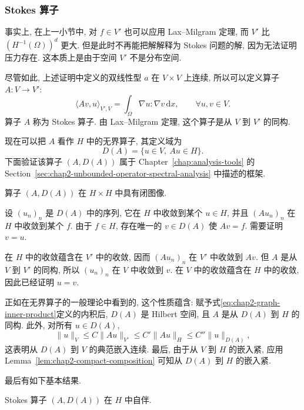 \subsubsection{Stokes 算子}
\label{subsec:chap4-stokes-operator}

事实上, 在上一小节中, 对 $f\in V'$ 也可以应用 Lax--Milgram 定理, 而 $V'$ 比 $(H^{-1}(\Omega))^d$ 更大. 但是此时不再能把解解释为 Stokes 问题的解, 因为无法证明压力存在. 这本质上是由于空间 $V'$ 不是分布空间.

尽管如此, 上述证明中定义的双线性型 $a$ 在 $V\times V$ 上连续, 所以可以定义算子 $A:V\to V'$:
\begin{equation}
 \langle Av,u\rangle_{V',V}=\int_\Omega\nabla u:\nabla v\,\mathrm dx,
 \qquad\forall u,v\in V.
 \label{eq:chap4-stokes-operator-variational}
\end{equation}
算子 $A$ 称为 Stokes 算子. 由 Lax--Milgram 定理, 这个算子是从 $V$ 到 $V'$ 的同构.

现在可以把 $A$ 看作 $H$ 中的无界算子, 其定义域为
\[
 D(A)=\{u\in V,\ Au\in H\}.
\]
下面验证该算子 $(A,D(A))$ 属于 Chapter~\ref{chap:analysis-tools} 的 Section~\ref{sec:chap2-unbounded-operator-spectral-analysis} 中描述的框架.

\begin{Lemma}
\label{lem:chap4-stokes-operator-closed-graph}
算子 $(A,D(A))$ 在 $H\times H$ 中具有闭图像.
\end{Lemma}

\begin{Proof}
设 $(u_n)_n$ 是 $D(A)$ 中的序列, 它在 $H$ 中收敛到某个 $u\in H$, 并且 $(Au_n)_n$ 在 $H$ 中收敛到某个 $f$. 由于 $f\in H$, 存在唯一的 $v\in D(A)$ 使 $Av=f$. 需要证明 $v=u$.

在 $H$ 中的收敛蕴含在 $V'$ 中的收敛, 因而 $(Au_n)_n$ 在 $V'$ 中收敛到 $Av$. 但 $A$ 是从 $V$ 到 $V'$ 的同构, 所以 $(u_n)_n$ 在 $V$ 中收敛到 $v$. 在 $V$ 中的收敛蕴含在 $H$ 中的收敛, 因此已经证明 $u=v$.
\end{Proof}

正如在无界算子的一般理论中看到的, 这个性质蕴含: 赋予式\eqref{eq:chap2-graph-inner-product}定义的内积后, $D(A)$ 是 Hilbert 空间, 且 $A$ 是从 $D(A)$ 到 $H$ 的同构. 此外, 对所有 $u\in D(A)$,
\[
 \|u\|_V\leq C\|Au\|_{V'}\leq C'\|Au\|_H\leq C''\|u\|_{D(A)},
\]
这表明从 $D(A)$ 到 $V$ 的典范嵌入连续. 最后, 由于从 $V$ 到 $H$ 的嵌入紧, 应用 Lemma~\ref{lem:chap2-compact-composition} 可知从 $D(A)$ 到 $H$ 的嵌入紧.

最后有如下基本结果.

\begin{Lemma}
\label{lem:chap4-stokes-operator-self-adjoint}
Stokes 算子 $(A,D(A))$ 在 $H$ 中自伴.
\end{Lemma}

